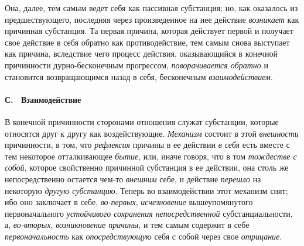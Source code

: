 Она, далее, тем самым ведет себя как пассивная субстанция; но, как оказалось
из предшествующего, последняя через произведенное на нее действие
{\em возникает} как причинная субстанция. Та первая
причина, которая действует первой и получает свое действие в себя обратно
как противодействие, тем самым снова выступает как причина, вследствие чего
процесс действия, оказывающийся в конечной причинности дурно-бесконечным
прогрессом, {\em поворачивается обратно} и становится
возвращающимся назад в себя, бесконечным
{\em взаимодействием}.

\paragraph[С. \ Взаимодействие]{С. \ Взаимодействие}
\hypertarget{Toc478978774}{}В конечной причинности сторонами отношения
служат субстанции, которые относятся друг к другу как воздействующие.
{\em Механизм} состоит в этой
{\em внешности} причинности, в том, что
{\em рефлексия} причины в ее действии
{\em в себя} есть вместе с тем некоторое отталкивающее
{\em бытие}, или, иначе говоря, что в том
{\em тождестве с собой}, которое свойственно причинной
субстанция в ее действии, она столь же непосредственно остается чем-то
{\em внешним} себе, и действие
{\em перешло} на некоторую
{\em другую субстанцию}. Теперь во взаимодействии этот
механизм снят; ибо оно заключает в себе,
{\em во-первых}, {\em исчезновение}
вышеупомянутого первоначального {\em устойчивого
сохранения непосредственной} субстанциальности, а,
{\em во-вторых}, {\em возникновение
причины}, и тем самым содержит в себе
{\em первоначальность} как
{\em опосредствующую} себя с собой через свое
{\em отрицание}.

